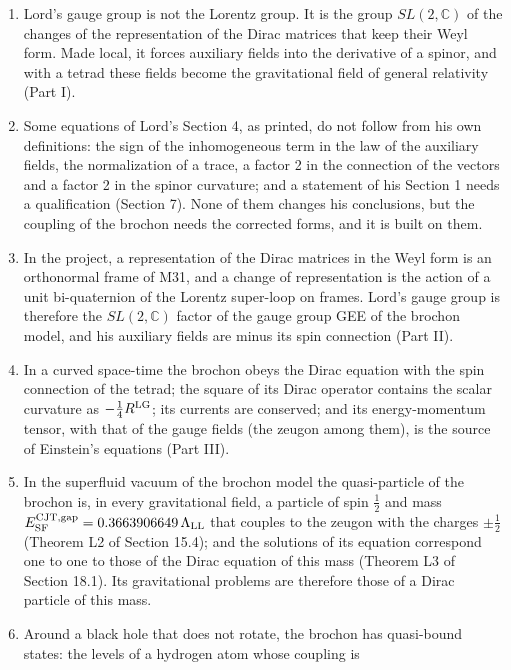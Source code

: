\documentclass[
  10pt,
]{article}
\providecommand{\tightlist}{%
  \setlength{\itemsep}{0pt}\setlength{\parskip}{0pt}}
\begin{document}
\begin{enumerate}
\def\labelenumi{\arabic{enumi}.}
\tightlist
\item
  Lord's gauge group is not the Lorentz group. It is the group
  \(SL(2,\mathbb C)\) of the changes of the representation of the Dirac
  matrices that keep their Weyl form. Made local, it forces auxiliary
  fields into the derivative of a spinor, and with a tetrad these fields
  become the gravitational field of general relativity (Part I).
\item
  Some equations of Lord's Section 4, as printed, do not follow from his
  own definitions: the sign of the inhomogeneous term in the law of the
  auxiliary fields, the normalization of a trace, a factor 2 in the
  connection of the vectors and a factor 2 in the spinor curvature; and
  a statement of his Section 1 needs a qualification (Section 7). None
  of them changes his conclusions, but the coupling of the brochon needs
  the corrected forms, and it is built on them.
\item
  In the project, a representation of the Dirac matrices in the Weyl
  form is an orthonormal frame of M31, and a change of representation is
  the action of a unit bi-quaternion of the Lorentz super-loop on
  frames. Lord's gauge group is therefore the \(SL(2,\mathbb C)\) factor
  of the gauge group GEE of the brochon model, and his auxiliary fields
  are minus its spin connection (Part II).
\item
  In a curved space-time the brochon obeys the Dirac equation with the
  spin connection of the tetrad; the square of its Dirac operator
  contains the scalar curvature as \(-\tfrac14R^{\rm LG}\); its currents
  are conserved; and its energy-momentum tensor, with that of the gauge
  fields (the zeugon among them), is the source of Einstein's equations
  (Part III).
\item
  In the superfluid vacuum of the brochon model the quasi-particle of
  the brochon is, in every gravitational field, a particle of spin
  \(\tfrac12\) and mass
  \(E^{\rm CJT,gap}_{\rm SF}=0.3663906649\,\Lambda_{\rm LL}\) that
  couples to the zeugon with the charges \(\pm\tfrac12\) (Theorem L2 of
  Section 15.4); and the solutions of its equation correspond one to one
  to those of the Dirac equation of this mass (Theorem L3 of Section
  18.1). Its gravitational problems are therefore those of a Dirac
  particle of this mass.
\item
  Around a black hole that does not rotate, the brochon has quasi-bound
  states: the levels of a hydrogen atom whose coupling is

\end{enumerate}
\end{document}
